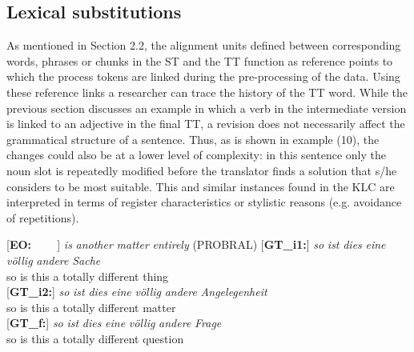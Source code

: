 \documentclass[output=paper]{LSP/langsci}
\begin{document}
\subsection{Lexical substitutions}
As mentioned in Section 2.2, the alignment units defined between corresponding words, phrases or chunks in the ST and the TT function as reference points to which the process tokens are linked during the pre-processing of the data. Using these reference links a researcher can trace the history of the TT word. While the previous section discusses an example in which a verb in the intermediate version is linked to an adjective in the final TT, a revision does not necessarily affect the grammatical structure of a sentence. Thus, as is shown in example (10), the changes could also be at a lower level of complexity: in this sentence only the noun slot is repeatedly modified before the translator finds a solution that s/he considers to be most suitable. This and similar instances found in the KLC are interpreted in terms of register characteristics or stylistic reasons (e.g. avoidance of repetitions).

\ea
\begin{xlist}
\exi{}[\textbf{EO:~~~~}]{ \emph{is} \emph{another} \emph{matter} \emph{entirely} (PROBRAL)}
\exi{}[\textbf{GT\_i1:}]{
\gll   \emph{so} \emph{ist} \emph{dies} \emph{eine} \emph{völlig} \emph{andere} \emph{Sache}\\
 so is this a totally different thing\\
 }
 \exi{}[\textbf{GT\_i2:}]{
\gll \emph{so} \emph{ist} \emph{dies} \emph{eine} \emph{völlig} \emph{andere} \emph{Angelegenheit} \\
 so is this a totally different matter\\
 }
 \exi{}[\textbf{GT\_f:}]{
\gll \emph{so} \emph{ist} \emph{dies} \emph{eine} \emph{völlig} \emph{andere} \emph{Frage} \\
 so is this a totally different question\\
 }
\end{xlist}
\z
\end{document}
